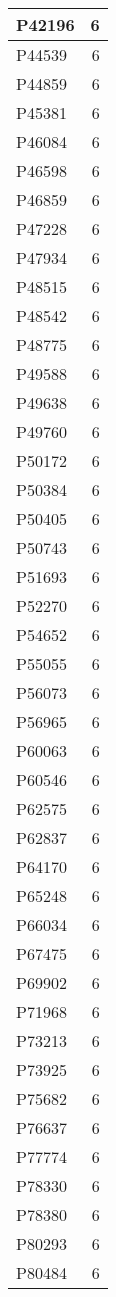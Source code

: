 \documentclass[
]{book}
\theoremstyle{definition}
\theoremstyle{definition}
\theoremstyle{definition}
\theoremstyle{definition}
\theoremstyle{remark}
\begin{document}
\begin{table}
\begin{tabular}{l|r}
\hline
P42196 & 6\\
\hline
P44539 & 6\\
\hline
P44859 & 6\\
\hline
P45381 & 6\\
\hline
P46084 & 6\\
\hline
P46598 & 6\\
\hline
P46859 & 6\\
\hline
P47228 & 6\\
\hline
P47934 & 6\\
\hline
P48515 & 6\\
\hline
P48542 & 6\\
\hline
P48775 & 6\\
\hline
P49588 & 6\\
\hline
P49638 & 6\\
\hline
P49760 & 6\\
\hline
P50172 & 6\\
\hline
P50384 & 6\\
\hline
P50405 & 6\\
\hline
P50743 & 6\\
\hline
P51693 & 6\\
\hline
P52270 & 6\\
\hline
P54652 & 6\\
\hline
P55055 & 6\\
\hline
P56073 & 6\\
\hline
P56965 & 6\\
\hline
P60063 & 6\\
\hline
P60546 & 6\\
\hline
P62575 & 6\\
\hline
P62837 & 6\\
\hline
P64170 & 6\\
\hline
P65248 & 6\\
\hline
P66034 & 6\\
\hline
P67475 & 6\\
\hline
P69902 & 6\\
\hline
P71968 & 6\\
\hline
P73213 & 6\\
\hline
P73925 & 6\\
\hline
P75682 & 6\\
\hline
P76637 & 6\\
\hline
P77774 & 6\\
\hline
P78330 & 6\\
\hline
P78380 & 6\\
\hline
P80293 & 6\\
\hline
P80484 & 6\\

\end{tabular}
\end{table}
\end{document}
